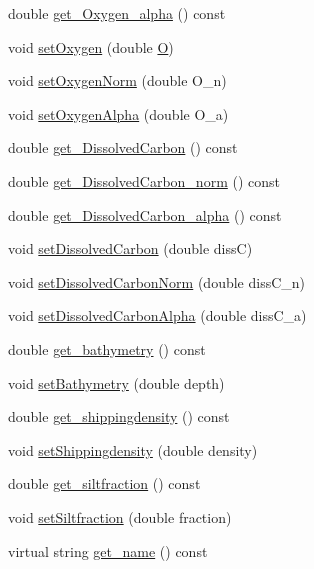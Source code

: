 \begin{DoxyCompactItemize}
double \mbox{\hyperlink{class_node_af9f2d5ea4bc513e2dbe9b2a2c41a0f0a}{get\+\_\+\+Oxygen\+\_\+alpha}} () const
\item 
void \mbox{\hyperlink{class_node_a36fce914134894b45280ffcb96832281}{set\+Oxygen}} (double \mbox{\hyperlink{options_8cpp_a783b2b010043abdfe013bb4662528b25}{O}})
\item 
void \mbox{\hyperlink{class_node_adb29bc270dedbfe54b00ab32b21e9d4d}{set\+Oxygen\+Norm}} (double O\+\_\+n)
\item 
void \mbox{\hyperlink{class_node_a628b36d32935835ff88274a97bf95959}{set\+Oxygen\+Alpha}} (double O\+\_\+a)
\item 
double \mbox{\hyperlink{class_node_a3a12a212ed94e99afeccb4dfdbc3f27f}{get\+\_\+\+Dissolved\+Carbon}} () const
\item 
double \mbox{\hyperlink{class_node_ada4f8fddd4cf702172a95b2b18bcd910}{get\+\_\+\+Dissolved\+Carbon\+\_\+norm}} () const
\item 
double \mbox{\hyperlink{class_node_a1d92235c77860d05d804cd40cf81c219}{get\+\_\+\+Dissolved\+Carbon\+\_\+alpha}} () const
\item 
void \mbox{\hyperlink{class_node_a6bdac2f6812a12a035768980818b2fde}{set\+Dissolved\+Carbon}} (double dissC)
\item 
void \mbox{\hyperlink{class_node_aa2bfb4dabb1d6b7d5e23cb0ab63c5ba2}{set\+Dissolved\+Carbon\+Norm}} (double diss\+C\+\_\+n)
\item 
void \mbox{\hyperlink{class_node_aa4a29b49baa827469c25fe9e54f683f1}{set\+Dissolved\+Carbon\+Alpha}} (double diss\+C\+\_\+a)
\item 
double \mbox{\hyperlink{class_node_ae4da934fddf16cecc9251773e6c34f4b}{get\+\_\+bathymetry}} () const
\item 
void \mbox{\hyperlink{class_node_a1cce5e8b3b596723d57b448da6209df8}{set\+Bathymetry}} (double depth)
\item 
double \mbox{\hyperlink{class_node_a4c8f7862b87a61425fec4d4d59bdadbb}{get\+\_\+shippingdensity}} () const
\item 
void \mbox{\hyperlink{class_node_a6bd52c96fcaca23b1cc5a629a6a3cf72}{set\+Shippingdensity}} (double density)
\item 
double \mbox{\hyperlink{class_node_a95ac62115588e015be01b321744bc20d}{get\+\_\+siltfraction}} () const
\item 
void \mbox{\hyperlink{class_node_ae693339b788bd83cef068425e69338d9}{set\+Siltfraction}} (double fraction)
\item 
virtual string \mbox{\hyperlink{class_node_afd4050178cc0d4eb0ff137466dcafdd8}{get\+\_\+name}} () const

\end{DoxyCompactItemize}
